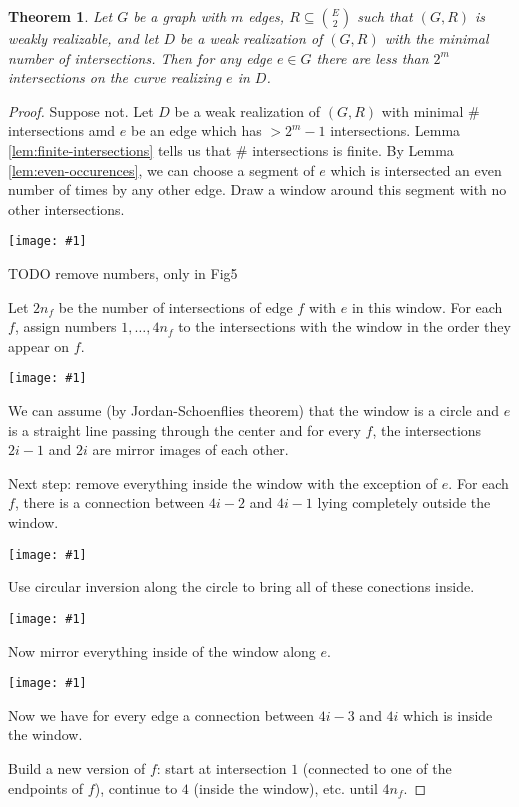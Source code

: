 \documentclass[12pt]{article}
\theoremstyle{plain} %
\newtheorem{theorem}{Theorem}
\newcommand{\image}[1]{\begin{center}\texttt{[image: \#1]}\end{center}}
\begin{document}
\begin{theorem}\label{thm:weak-realizability-bound}
    Let \(G\) be a graph with \(m\) edges, \(R \subseteq \binom{E}{2}\) such that \((G, R)\) is weakly realizable, and let \(D\) 
    be a weak realization of \((G, R)\) with the minimal number of intersections. Then for any edge \(e \in G\) 
    there are less than \(2^m\) intersections on the curve realizing \(e\) in \(D\).
\end{theorem}

\begin{proof}
Suppose not. Let \(D\) be a weak realization of \((G, R)\) with minimal \# intersections amd \(e\) 
be an edge which has \(> 2^m - 1\) intersections. Lemma \ref{lem:finite-intersections} tells us that \# intersections is finite.
By Lemma \ref{lem:even-occurences}, we can choose a segment of \(e\) which is intersected an even number of times by any other edge.
Draw a window around this segment with no other intersections. 

\image{images/figure-4.jpeg}
TODO remove numbers, only in Fig5

Let \(2n_f\) be the number of intersections of edge \(f\) with \(e\) in this window.
For each \(f\), assign numbers \(1, \ldots, 4 n_f\) to the intersections with the window in the 
order they appear on \(f\). 

\image{images/figure-5.jpeg}

We can assume (by Jordan-Schoenflies theorem) that the window is a circle and \(e\) is a straight line passing through the center
and for every \(f\), the intersections \(2i-1\) and \(2i\) are mirror images of each other.

Next step: remove everything inside the window with the exception of \(e\). For each \(f\), there is a connection between 
\(4i-2\) and \(4i-1\) lying completely outside the window. 

\image{images/figure-6.jpeg}

Use circular inversion along the circle to bring all of these conections inside.

\image{images/figure-7.jpeg}

Now mirror everything inside of the window along \(e\).

\image{images/figure-8.jpeg}

Now we have for every edge a connection between \(4i-3\) and \(4i\) which is inside the window.

Build a new version of \(f\): start at intersection \(1\) (connected to one of the endpoints of \(f\)),
continue to \(4\) (inside the window), etc. until \(4 n_f\).


\end{proof}
\end{document}
